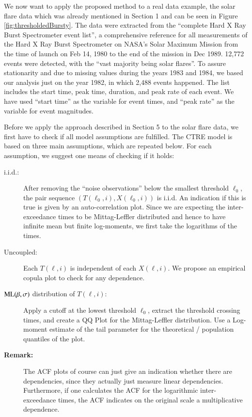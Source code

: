 \documentclass[]{elsarticle} %
\begin{document}
We now want to apply the proposed method to a real data example, the
solar flare data which was already mentioned in Section 1 and can be
seen in Figure \ref{fig:thresholdedBursty}. The data were extracted from
the ``complete Hard X Ray Burst Spectrometer event list'', a
comprehensive reference for all measurements of the Hard X Ray Burst
Spectrometer on NASA's Solar Maximum Mission from the time of launch on
Feb 14, 1980 to the end of the mission in Dec 1989. 12,772 events were
detected, with the ``vast majority being solar flares''. To assure
stationarity and due to missing values during the years 1983 and 1984,
we based our analysis just on the year 1982, in which 2,488 events
happened. The list includes the start time, peak time, duration, and
peak rate of each event. We have used ``start time'' as the variable for
event times, and ``peak rate'' as the variable for event magnitudes.

Before we apply the approach described in Section 5 to the solar flare
data, we first have to check if all model assumptions are fulfilled. The
CTRE model is based on three main assumptions, which are repeated below.
For each assumption, we suggest one means of checking if it holds:

\begin{description}
\item[i.i.d.:]
After removing the ``noise observations'' below the smallest threshold
\(\ell_0\), the pair sequence \((T(\ell_0, i), X(\ell_0,i))\) is i.i.d.
An indication if this is true is given by an auto-correlation plot.
Since we are expecting the inter-exceedance times to be Mittag-Leffler
distributed and hence to have infinite mean but finite log-moments, we
first take the logarithms of the times.
\item[Uncoupled:]
Each \(T(\ell, i)\) is independent of each \(X(\ell, i)\). We propose an
empirical copula plot to check for any dependence.
\item[\({\rm ML}(\beta, \sigma)\) distribution of \(T(\ell, i)\):]
Apply a cutoff at the lowest threshold \(\ell_0\), extract the threshold
crossing times, and create a QQ Plot for the Mittag-Leffler
distribution. Use a Log-moment estimate of the tail parameter for the
theoretical / population quantiles of the plot.
\item[\textbf{Remark:}]
The ACF plots of course can just give an indication whether there are
dependencies, since they actually just measure linear dependencies.
Furthermore, if one calculates the ACF for the logarithmic
inter-exceedance times, the ACF indicates on the original scale a
multiplicative dependence.
\end{description}
\end{document}
